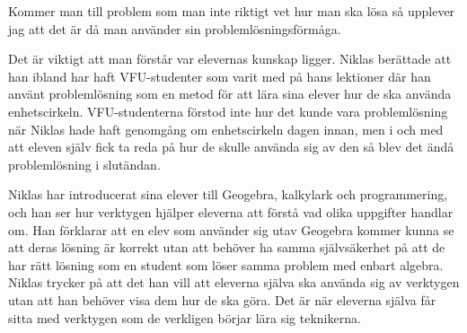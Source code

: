 \begin{displayquote}
\textcolor{turkos}{
Kommer man till problem som man inte riktigt vet hur man ska lösa så upplever jag att det är då man använder sin problemlösningsförmåga.
}
\end{displayquote}

\textcolor{turkos}{
Det är viktigt att man förstår var elevernas kunskap ligger. Niklas berättade att han ibland har haft VFU-studenter som varit med på hans lektioner där han använt problemlösning som en metod för att lära sina elever hur de ska använda enhetscirkeln. VFU-studenterna förstod inte hur det kunde vara problemlösning när Niklas hade haft genomgång om enhetscirkeln dagen innan, men i och med att eleven själv fick ta reda på hur de skulle använda sig av den så blev det ändå problemlösning i slutändan. 
}

\textcolor{turkos}{
Niklas har introducerat sina elever till Geogebra, kalkylark och programmering, och han ser hur verktygen hjälper eleverna att förstå vad olika uppgifter handlar om. Han förklarar att en elev som använder sig utav Geogebra kommer kunna se att deras lösning är korrekt utan att behöver ha samma självsäkerhet på att de har rätt lösning som en student som löser samma problem med enbart algebra. Niklas trycker på att det han vill att eleverna själva ska använda sig av verktygen utan att han behöver visa dem hur de ska göra. Det är när eleverna själva får sitta med verktygen som de verkligen börjar lära sig teknikerna.
} 


